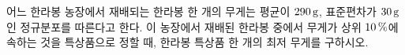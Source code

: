 어느 한라봉 농장에서 재배되는 한라봉 한 개의 무게는 평균이 $290\mkern3mu \mathrm{g}$, 표준편차가 $30\mkern3mu \mathrm{g}$인 정규분포를 따른다고 한다. 이 농장에서 재배된 한라봉 중에서 무게가 상위 $10\mkern3mu \%$에 속하는 것을 특상품으로 정할 때, 한라봉 특상품 한 개의 최저 무게를 구하시오. 

